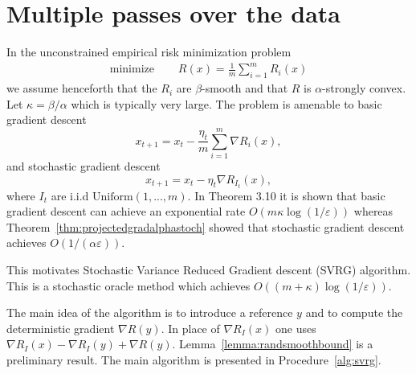 \section{Multiple passes over the data}
In the unconstrained empirical risk minimization problem
\begin{align*}
	\text{minimize }\quad   & R(x) = \frac{1}{m}\sum_{i=1}^m R_i(x)
\end{align*}
we assume henceforth that the $R_i$ are $\beta$-smooth and that $R$ is $\alpha$-strongly convex. Let $\kappa = \beta/\alpha$ which is typically very large. The problem is amenable to basic gradient descent
\begin{equation*}
	x_{t+1}= x_t - \frac{\eta_t}{m}\sum_{i=1}^m \nabla R_i(x),
\end{equation*}
and stochastic gradient descent
\begin{equation*}
	x_{t+1}= x_t - \eta_t \nabla R_{I_t}(x),
\end{equation*}
where $I_t$ are i.i.d $\text{Uniform}(1, ..., m)$. In \cite{bubeck} Theorem 3.10 it is shown that basic gradient descent can achieve an exponential rate $O(m\kappa\log(1/\varepsilon))$ whereas Theorem~\ref{thm:projectedgradalphastoch} showed that stochastic gradient descent achieves $O(1/(\alpha\varepsilon))$.

This motivates Stochastic Variance Reduced Gradient descent (SVRG) algorithm. This is a stochastic oracle method which achieves $O((m+\kappa)\log(1/\varepsilon))$.

The main idea of the algorithm is to introduce a reference $y$ and to compute the deterministic gradient $\nabla R(y)$. In place of $\nabla R_I(x)$ one uses $\nabla R_I(x) - \nabla R_I(y) + \nabla R(y)$. Lemma~\ref{lemma:randsmoothbound} is a preliminary result. The main algorithm is presented in Procedure~\ref{alg:svrg}.

